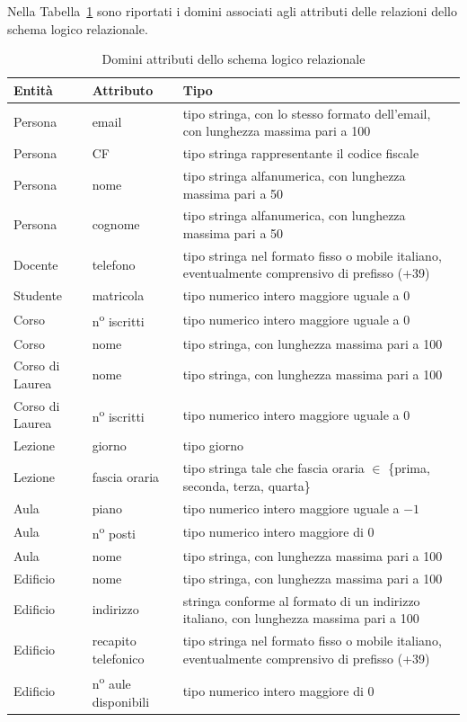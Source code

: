 \documentclass[a4paper,11pt]{article}
\begin{document}
Nella Tabella~\ref{tab:attributes_rel_schema} sono riportati i domini associati agli attributi delle relazioni dello schema logico relazionale.

\begin{table}[H]
\centering
\begin{tabularx}{\textwidth}{l l X}
    \toprule
    \textbf{Entità} & \textbf{Attributo} & \textbf{Tipo} \\
    \midrule
    Persona & email & tipo stringa, con lo stesso formato dell'email, con lunghezza massima pari a 100 \\
    Persona & CF & tipo stringa rappresentante il codice fiscale \\
    Persona & nome & tipo stringa alfanumerica, con lunghezza massima pari a 50 \\
    Persona & cognome & tipo stringa alfanumerica, con lunghezza massima pari a 50 \\
    Docente & telefono & tipo stringa nel formato fisso o mobile italiano, eventualmente comprensivo di prefisso (+39) \\
    Studente & matricola & tipo numerico intero maggiore uguale a $0$ \\
    Corso & n\textsuperscript{o} iscritti & tipo numerico intero maggiore uguale a $0$ \\
    Corso & nome & tipo stringa, con lunghezza massima pari a 100 \\
    Corso di Laurea & nome & tipo stringa, con lunghezza massima pari a 100 \\
    Corso di Laurea & n\textsuperscript{o} iscritti & tipo numerico intero maggiore uguale a $0$ \\
    Lezione & giorno & tipo giorno \\
    Lezione & fascia oraria & tipo stringa tale che fascia oraria $\in$ \{prima, seconda, terza, quarta\} \\
    Aula & piano & tipo numerico intero maggiore uguale a $-1$ \\
    Aula & n\textsuperscript{o} posti & tipo numerico intero maggiore di $0$ \\
    Aula & nome & tipo stringa, con lunghezza massima pari a 100 \\
    Edificio & nome & tipo stringa, con lunghezza massima pari a 100 \\
    Edificio & indirizzo & stringa conforme al formato di un indirizzo italiano, con lunghezza massima pari a 100 \\
    Edificio & recapito telefonico & tipo stringa nel formato fisso o mobile italiano, eventualmente comprensivo di prefisso (+39) \\
    Edificio & n\textsuperscript{o} aule disponibili & tipo numerico intero maggiore di $0$ \\
    
    \bottomrule
\end{tabularx}
\caption{Domini attributi dello schema logico relazionale}
\label{tab:attributes_rel_schema}
\end{table}
\end{document}
